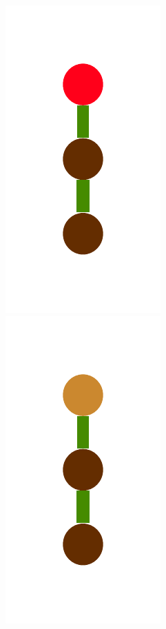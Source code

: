\documentclass[a4paper,10pt]{article}
\begin{document}
\begin{figure}[t]
\includegraphics[scale=.26]{../figures/vector/4-2-4-constructor-induction-pre-4.pdf}
\includegraphics[scale=.26]{../figures/vector/4-2-4-constructor-induction-pre-5.pdf}

\end{figure}
\end{document}
